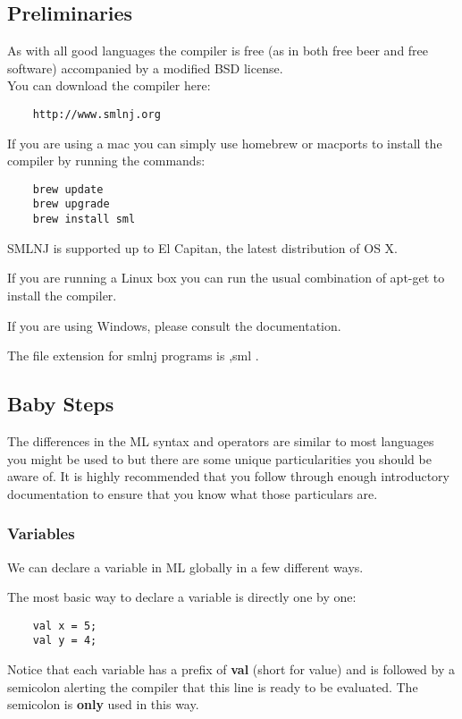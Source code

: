 \subsection{Preliminaries}

As with all good languages the compiler is free (as in both free beer and free software) accompanied by a modified BSD license. \\
You can download the compiler here: \\
\begin{verbatim}
    http://www.smlnj.org
\end{verbatim}

If you are using a mac you can simply use homebrew or macports to install the compiler by running the commands: \\
\begin{verbatim}
    brew update
    brew upgrade
    brew install sml
\end{verbatim}
SMLNJ is supported up to El Capitan, the latest distribution of OS X. 

If you are running a Linux box you can run the usual combination of apt-get to install the compiler. 

If you are using Windows, please consult the documentation.

The file extension for smlnj programs is ,sml .

\subsection{Baby Steps}

The differences in the ML syntax and operators are similar to most languages you might be used to but there are some unique particularities you should be aware of. It is highly recommended that you follow through enough introductory documentation to ensure that you know what those particulars are. 

\subsubsection{Variables}

We can declare a variable in ML globally in a few different ways.

The most basic way to declare a variable is directly one by one:

\begin{verbatim}
    val x = 5;
    val y = 4;
\end{verbatim}
Notice that each variable has a prefix of \textbf{val} (short for value) and is followed by a semicolon alerting the compiler that this line is ready to be evaluated. The semicolon is \textbf{only} used in this way.

